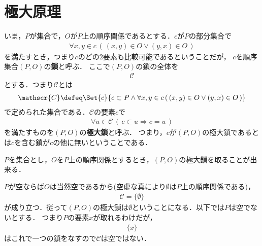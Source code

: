 \section{極大原理}
	いま，$P$が集合で，$O$が$P$上の順序関係であるとする．$c$が$P$の部分集合で
	\begin{align}
		\forall x,y \in c\, (\, (x,y) \in O \vee (y,x) \in O\, )
	\end{align}
	を満たすとき，つまり$c$のどの$2$要素も比較可能であるということだが，
	$c$を順序集合$(P,O)$の{\bf 鎖}と呼ぶ．
	ここで$(P,O)$の鎖の全体を
	\begin{align}
		\mathscr{C}
	\end{align}
	とする．つまり$\mathscr{C}$とは
	\begin{align}
		\mathscr{C} \defeq \Set{c}{c \subset P \wedge \forall x,y \in c\, (\, (x,y) \in O \vee (y,x) \in O\, )}
	\end{align}	
	で定められた集合である．$\mathscr{C}$の要素$c$で
	\begin{align}
		\forall u \in \mathscr{C}\, (\, c \subset u \Longrightarrow c=u\, )
	\end{align}
	を満たすものを$(P,O)$の{\bf 極大鎖}と呼ぶ．
	つまり，$c$が$(P,O)$の極大鎖であるとは$c$を含む鎖が$c$の他に無いということである．
	
	\begin{screen}
		\begin{thm}[極大鎖は必ず存在する]
		\label{thm:existence_of_maximal_chain}
			$P$を集合とし，$O$を$P$上の順序関係とするとき，$(P,O)$の極大鎖を取ることが出来る．
		\end{thm}
	\end{screen}
	
	$P$が空ならば$O$は当然空であるから(空虚な真により$\emptyset$は$P$上の順序関係である)，
	\begin{align}
		\mathscr{C} = \{\emptyset\}
	\end{align}
	が成り立つ．従って$(P,O)$の極大鎖は$\emptyset$ということになる．以下では$P$は空でないとする．
	つまり$P$の要素$x$が取れるわけだが，
	\begin{align}
		\{x\}
	\end{align}
	はこれで一つの鎖をなすので$\mathscr{C}$は空ではない．
	
